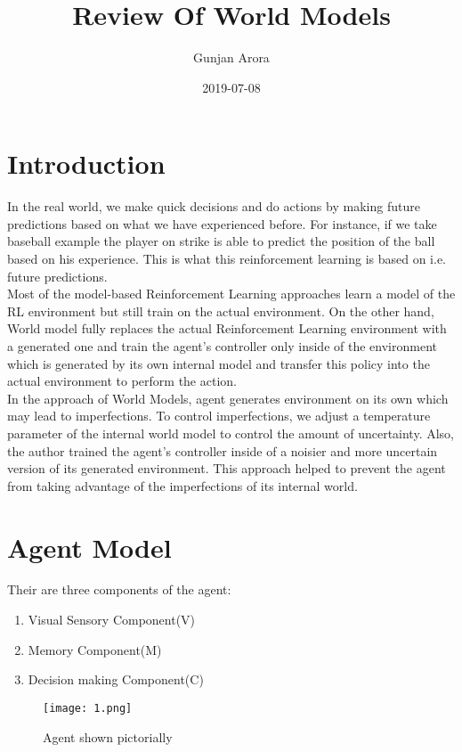 \documentclass{article}
\title{Review Of World Models}
\date{2019-07-08}
\author{Gunjan Arora}
\begin{document}
\maketitle
{}
\newpage
{}

\section{Introduction}

In the real world, we make quick decisions and do actions by making future predictions based on what we have experienced before. For instance, if we take baseball example the player on strike is able to predict the position of the ball based on his experience. This is what this reinforcement learning is based on i.e. future predictions. \\
Most of the model-based Reinforcement Learning approaches learn a model of the RL environment but still train on the actual environment. On the other hand, World model fully replaces the actual Reinforcement Learning environment with a generated one and train the agent's controller only inside of the environment which is generated by its own internal model and transfer this policy into the actual environment to perform the action.\\
In the approach of World Models, agent generates environment on its own which may lead to imperfections. To control imperfections, we adjust a temperature parameter of the internal world model to control the amount of uncertainty. Also, the author trained the agent's controller inside of a noisier and more uncertain version of its generated environment. This approach helped to prevent the agent from taking advantage of the imperfections of its internal world.

\section{Agent Model}

Their are three components of the agent:\\
\begin{enumerate}
	\item Visual Sensory Component(V)
	\item Memory Component(M)
	\item Decision making Component(C)
\end{enumerate}

\begin{figure}[H]
  \texttt{[image: 1.png]}
  \caption{Agent shown pictorially}
\end{figure}
\end{document}
